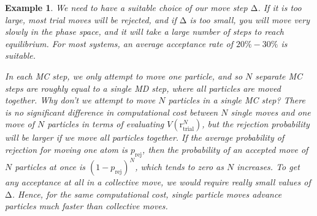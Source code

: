 \documentclass{article}
\theoremstyle{plain}\theoremheaderfont{\normalfont\itshape}\theorembodyfont{\rmfamily}\theoremseparator{.}\newtheorem*{rem}{Remark}\newtheorem*{ex}{Example}\newtheorem*{proof}{Proof}\newtheorem*{altp}{Alternative proof}
\theoremstyle{plain}\theoremheaderfont{\normalfont\bfseries}\theorembodyfont{\rmfamily}\theoremseparator{.}\newtheorem{thm}{Theorem}[section]\newtheorem{lem}[thm]{Lemma}\newtheorem{prop}[thm]{Proposition}\newtheorem*{cor}{Corollary}\newtheorem{defn}[thm]{Definition}\newtheorem{clm}[thm]{Claim}\newtheorem{clminproof}{Claim}\newtheorem{alg}[thm]{Algorithm}\newtheorem{hyp}[thm]{Hypothesis}\newtheorem{law}[thm]{Law}
\theoremstyle{break}\theoremheaderfont{\normalfont\itshape}\theorembodyfont{\rmfamily}\theoremseparator{.\medskip}\newtheorem*{proofskip}{Proof}\newtheorem*{exs}{Examples}\newtheorem*{rems}{Remarks}
\theoremstyle{break}\theoremheaderfont{\normalfont\bfseries}\theorembodyfont{\rmfamily}\theoremseparator{.\medskip}\newtheorem{lemskip}[thm]{Lemma}\newtheorem{defnskip}[thm]{Definition}\newtheorem{propskip}[thm]{Proposition}\newtheorem{thmskip}[thm]{Theorem}
\numberwithin{equation}{section}
\newcommand{\vb}[1]{\bm{\mathrm{#1}}}
\begin{document}
\begin{ex}
        We need to have a suitable choice of our move step \(\vb{\Delta}\). If it is too large, most trial moves will be rejected, and if \(\vb{\Delta}\) is too small, you will move very slowly in the phase space, and it will take a large number of steps to reach equilibrium. For most systems, an average acceptance rate of \(20\%-30\%\) is suitable.

        In each MC step, we only attempt to move one particle, and so \(N\) separate MC steps are roughly equal to a single MD step, where all particles are moved together. Why don't we attempt to move \(N\) particles in a single MC step? There is no significant difference in computational cost between \(N\) single moves and one move of \(N\) particles in terms of evaluating \(V(\vb{r}_{\text{trial}}^N)\), but the rejection probability will be larger if we move all particles together. If the average probability of rejection for moving one atom is \(p_{\text{rej}}\), then the probability of an accepted move of \(N\) particles at once is \((1-p_{\text{rej}})^N\), which tends to zero as \(N\) increases. To get any acceptance at all in a collective move, we would require really small values of \(\vb{\Delta}\). Hence, for the same computational cost, single particle moves advance particles much faster than collective moves.
    \end{ex}
\end{document}
